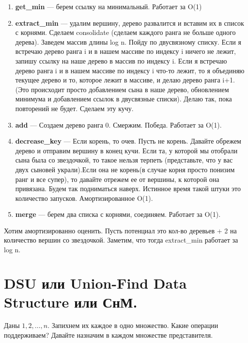 \documentclass{article}
\begin{document}
\begin{enumerate}
    \item \textbf{get\_min}  --- берем ссылку на минимальный. Работает за O(1)

    \item \textbf{extract\_min} ---  удалим вершину, дерево развалится и вставим их в список с корнями. Сделаем consolidate (сделаем каждого ранга не больше одного дерева).  Заведем массив длины log n. Пойду по двусвязному списку. Если я встречаю дерево ранга i и в нашем массиве по индексу i ничего не лежит, запишу ссылку на наше дерево в массив по индексу i. Если я встречаю дерево ранга i и в нашем массиве по индексу i что-то лежит, то я объединяю текущее дерево и то, которое лежит в массиве, и делаю дерево ранга i+1.(Это происходит просто добавлением сына в наше дерево, обновлением минимума и добавлением ссылок в двусвязные списки). Делаю так, пока повторений не будет. Сделаем эту кучу. 
    
    \item \textbf{add}  --- Создаем дерево ранга 0. Смержим. Победа. Работает за O(1).
    
    \item \textbf{decrease\_key} --- Если корень, то очев. Пусть не корень. Давайте обрежем дерево  и отправим вершину в конец кучи. Если та, у которой мы отобрали сына была со звездочкой, то такое нельзя терпеть (представьте, что у вас двух сыновей украли).Если она не корень(в случае корня просто понизим ранг и все супер), то давайте отрежем ее от вершины, к которой она привязана. Будем так подниматься наверх. Истинное время такой штуки это количество запусков. Амортизированное O(1).

    \item \textbf{merge} --- берем два списка с корнями, соединяем. Работает за O(1).
\end{enumerate}

Хотим амортизированно оценить. Пусть потенциал это кол-во деревьев + 2 на количество вершин со звездочкой. Заметим, что тогда extract\_min работает за log n. 


\pagebreak

\section{DSU или Union-Find Data Structure или СнМ.}

Даны $1,2,\ldots,n$. Запихнем их каждое в одно множество. Какие операции поддерживаем? Давайте назначим в каждом множестве представителя.
\end{document}
